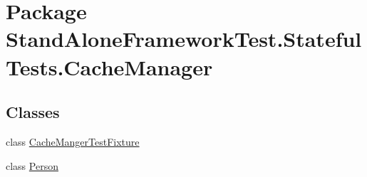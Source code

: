 \hypertarget{namespace_stand_alone_framework_test_1_1_stateful_tests_1_1_cache_manager}{\section{Package Stand\+Alone\+Framework\+Test.\+Stateful\+Tests.\+Cache\+Manager}
\label{namespace_stand_alone_framework_test_1_1_stateful_tests_1_1_cache_manager}
}
\subsection*{Classes}
\begin{DoxyCompactItemize}
\item 
class \hyperlink{class_stand_alone_framework_test_1_1_stateful_tests_1_1_cache_manager_1_1_cache_manger_test_fixture}{Cache\+Manger\+Test\+Fixture}
\item 
class \hyperlink{class_stand_alone_framework_test_1_1_stateful_tests_1_1_cache_manager_1_1_person}{Person}
\end{DoxyCompactItemize}
